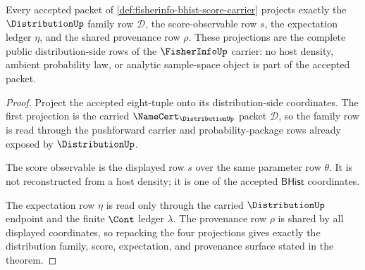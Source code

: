 \begin{theorem}
\label{thm:fisherinfo-distribution-score-row-coverage}
Every accepted packet of
\autoref{def:fisherinfo-bhist-score-carrier} projects exactly the
$\DistributionUp$ family row $\mathcal{D}$, the score-observable row $s$, the
expectation ledger $\eta$, and the shared provenance row $\rho$. These
projections are the complete public distribution-side rows of the
$\FisherInfoUp$ carrier: no host density, ambient probability law, or analytic
sample-space object is part of the accepted packet.
\end{theorem}
\begin{proof}
Project the accepted eight-tuple onto its distribution-side coordinates. The
first projection is the carried $\NameCert_{\DistributionUp}$ packet
$\mathcal{D}$, so the family row is read through the pushforward carrier and
probability-package rows already exposed by $\DistributionUp$.

The score observable is the displayed row $s$ over the same parameter row
$\theta$. It is not reconstructed from a host density; it is one of the
accepted $\mathsf{BHist}$ coordinates.

The expectation row $\eta$ is read only through the carried
$\DistributionUp$ endpoint and the finite $\Cont$ ledger $\lambda$. The
provenance row $\rho$ is shared by all displayed coordinates, so repacking the
four projections gives exactly the distribution family, score, expectation,
and provenance surface stated in the theorem.
\end{proof}

